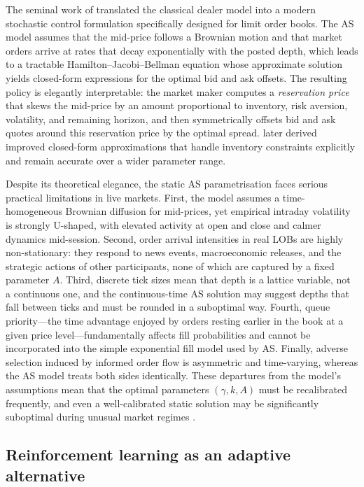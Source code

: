 \documentclass[11pt]{article}
\begin{document}
The seminal work of \textcite{avellaneda2008hftlob} translated the
classical dealer model into a modern stochastic control formulation
specifically designed for limit order books.
The AS model assumes that the mid-price follows a Brownian motion and
that market orders arrive at rates that decay exponentially with the
posted depth, which leads to a tractable Hamilton--Jacobi--Bellman
equation whose approximate solution yields closed-form expressions for
the optimal bid and ask offsets.
The resulting policy is elegantly interpretable: the market maker computes
a \emph{reservation price} that skews the mid-price by an amount
proportional to inventory, risk aversion, volatility, and remaining
horizon, and then symmetrically offsets bid and ask quotes around this
reservation price by the optimal spread.
\textcite{gueant2013inventory} later derived improved closed-form
approximations that handle inventory constraints explicitly and remain
accurate over a wider parameter range.

Despite its theoretical elegance, the static AS parametrisation faces
serious practical limitations in live markets.
First, the model assumes a time-homogeneous Brownian diffusion for
mid-prices, yet empirical intraday volatility is strongly U-shaped,
with elevated activity at open and close and calmer dynamics mid-session.
Second, order arrival intensities in real LOBs are highly non-stationary:
they respond to news events, macroeconomic releases, and the strategic
actions of other participants, none of which are captured by a fixed
parameter $A$.
Third, discrete tick sizes mean that depth is a lattice variable,
not a continuous one, and the continuous-time AS solution may suggest
depths that fall between ticks and must be rounded in a suboptimal way.
Fourth, queue priority---the time advantage enjoyed by orders resting
earlier in the book at a given price level---fundamentally affects fill
probabilities and cannot be incorporated into the simple exponential fill
model used by AS.
Finally, adverse selection induced by informed order flow is asymmetric
and time-varying, whereas the AS model treats both sides identically.
These departures from the model's assumptions mean that the optimal
parameters $(\gamma, k, A)$ must be recalibrated frequently, and even a
well-calibrated static solution may be significantly suboptimal during
unusual market regimes \parencite{cont2013markovlob,cartea2015ahft}.

\subsection{Reinforcement learning as an adaptive alternative}
\end{document}
